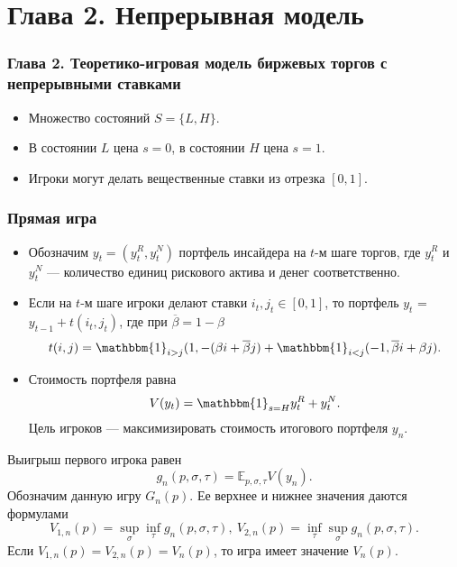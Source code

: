 \documentclass[12pt]{beamer}
\newcommand{\Co}{\beta}
\newcommand{\DCo}{\overline{\beta}}
\newcommand{\E}{\ensuremath{\mathbb{E}}}
\newcommand{\Ind}{\mathbbm{1}}
\begin{document}
\section{Глава 2. Непрерывная модель}

\begin{frame}
  \frametitle{Глава 2. Теоретико-игровая  модель биржевых торгов с непрерывными ставками}
  
  \begin{itemize}
  \item 
  Множество состояний $S = \{L, H\}$.
  \item
  В состоянии $L$ цена $s=0$, в состоянии $H$ цена $s=1$.
  \item
  Игроки могут делать вещественные ставки из отрезка $[0, 1]$.
  \end{itemize}
\end{frame}

\begin{frame}
  \frametitle{Прямая игра}
  
    \begin{itemize}
    \item Обозначим $y_t = (y^R_t, y^N_t)$ портфель инсайдера на $t$-м шаге
      торгов, где $y^R_t$ и $y^N_t$ --- количество единиц рискового актива и
      денег соответственно.
    \item Если на $t$-м шаге игроки делают ставки $i_{t}, j_{t} \in [0,1]$,
      то портфель $y_t$ = $y_{t-1} + t(i_{t}, j_{t})$, где при $\DCo = 1 - \Co$
      \[
        t(i, j) =
        \Ind_{i > j}(1, -(\Co i + \DCo j) +
        \Ind_{i < j}(-1, \DCo i + \Co j).
      \]
    \item Стоимость портфеля равна
      \[
        V(y_t) = \Ind_{s = H} y^R_t + y^N_t.
      \]
      Цель игроков --- максимизировать стоимость итогового портфеля $y_n$.
    \end{itemize}
\end{frame}

\begin{frame}
  Выигрыш первого игрока равен
  \begin{equation*}
    g_n(p, \sigma, \tau) = \E_{p, \sigma, \tau} V(y_n).
  \end{equation*}
  Обозначим данную игру $G_n(p)$. Ее верхнее и нижнее значения даются
  формулами
  \begin{equation*}
    V_{1,n}(p) = \sup_\sigma \inf_\tau g_n(p, \sigma, \tau), \:
    V_{2,n}(p) = \inf_\tau \sup_\sigma g_n(p, \sigma, \tau).
  \end{equation*}
  Если $V_{1,n}(p) = V_{2,n}(p) = V_n(p)$, то игра имеет значение $V_n(p)$.
\end{frame}
  
\end{document}
